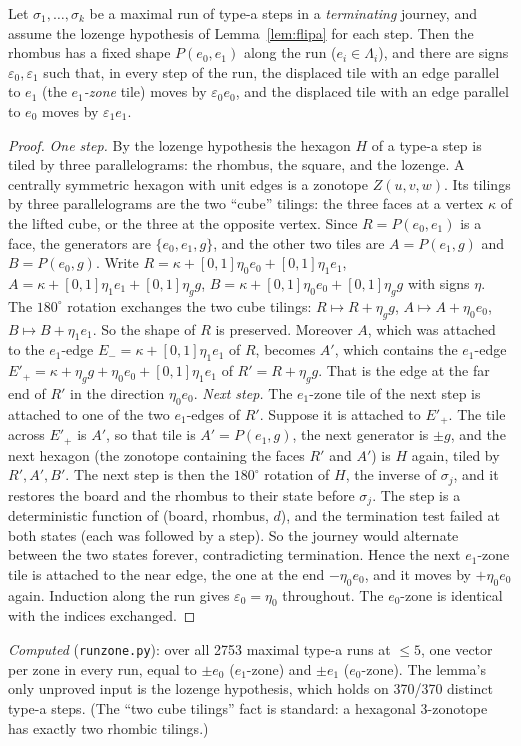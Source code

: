 \documentclass[11pt]{article}
\theoremstyle{definition}\newtheorem{definition}[theorem]{Definition}\newtheorem{remark}[theorem]{Remark}
\begin{document}
\begin{lemma}\label{lem:runzone}
Let $\sigma_1,\dots,\sigma_k$ be a maximal run of type-a steps in a \emph{terminating} journey, and assume the lozenge hypothesis of Lemma~\ref{lem:flipa} for each step.
Then the rhombus has a fixed shape $P(e_0,e_1)$ along the run ($e_i\in\Lambda_i$), and there are signs $\varepsilon_0,\varepsilon_1$ such that, in every step of the run, the displaced tile with an edge parallel to $e_1$ (the \emph{$e_1$-zone} tile) moves by $\varepsilon_0e_0$,
and the displaced tile with an edge parallel to $e_0$ moves by $\varepsilon_1e_1$.
\end{lemma}
\begin{proof}
\emph{One step.} By the lozenge hypothesis the hexagon $H$ of a type-a step is tiled by three parallelograms: the rhombus, the square, and the lozenge. A centrally symmetric hexagon with unit edges is a zonotope $Z(u,v,w)$.
Its tilings by three parallelograms are the two ``cube'' tilings: the three faces at a vertex $\kappa$ of the lifted cube, or the three at the opposite vertex. Since $R=P(e_0,e_1)$ is a face, the generators are $\{e_0,e_1,g\}$, and the other two tiles are $A=P(e_1,g)$ and $B=P(e_0,g)$.
Write $R=\kappa+[0,1]\eta_0e_0+[0,1]\eta_1e_1$, $A=\kappa+[0,1]\eta_1e_1+[0,1]\eta_gg$, $B=\kappa+[0,1]\eta_0e_0+[0,1]\eta_gg$ with signs $\eta$. The $180^\circ$ rotation exchanges the two cube tilings:
$R\mapsto R+\eta_gg$, $A\mapsto A+\eta_0e_0$, $B\mapsto B+\eta_1e_1$. So the shape of $R$ is preserved. Moreover $A$, which was attached to the $e_1$-edge $E_-=\kappa+[0,1]\eta_1e_1$ of $R$, becomes $A'$, which contains the $e_1$-edge $E'_+=\kappa+\eta_gg+\eta_0e_0+[0,1]\eta_1e_1$ of $R'=R+\eta_gg$. That is the edge at the far end of $R'$ in the direction $\eta_0e_0$.
\emph{Next step.} The $e_1$-zone tile of the next step is attached to one of the two $e_1$-edges of $R'$. Suppose it is attached to $E'_+$. The tile across $E'_+$ is $A'$, so that tile is $A'=P(e_1,g)$, the next generator is $\pm g$, and the next hexagon (the zonotope containing the faces $R'$ and $A'$) is $H$ again, tiled by $R',A',B'$.
The next step is then the $180^\circ$ rotation of $H$, the inverse of $\sigma_j$, and it restores the board and the rhombus to their state before $\sigma_j$. The step is a deterministic function of (board, rhombus, $d$), and the termination test failed at both states (each was followed by a step).
So the journey would alternate between the two states forever, contradicting termination. Hence the next $e_1$-zone tile is attached to the near edge, the one at the end $-\eta_0e_0$, and it moves by $+\eta_0e_0$ again. Induction along the run gives $\varepsilon_0=\eta_0$ throughout. The $e_0$-zone is identical with the indices exchanged.
\end{proof}
\noindent\emph{Computed} (\texttt{runzone.py}): over all 2753 maximal type-a runs at $\le5$, one vector per zone in every run, equal to $\pm e_0$ ($e_1$-zone) and $\pm e_1$ ($e_0$-zone).
The lemma's only unproved input is the lozenge hypothesis, which holds on 370/370 distinct type-a steps.
(The ``two cube tilings'' fact is standard: a hexagonal 3-zonotope has exactly two rhombic tilings.)
\end{document}
